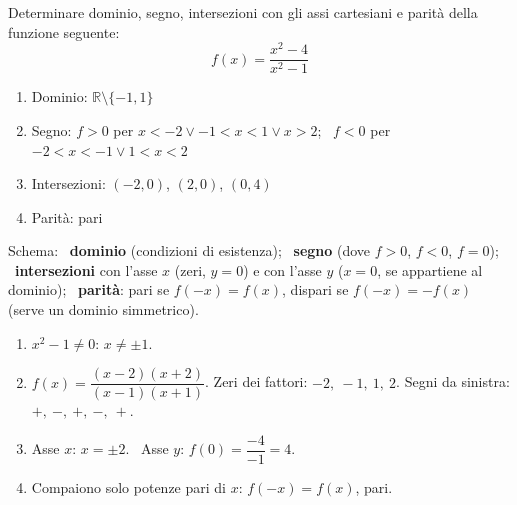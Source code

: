 \begin{question}[ID=1.4, subtitle={Studio di una funzione razionale pari}, difficulty=media, tags={funzioni, studio di funzione}]
Determinare dominio, segno, intersezioni con gli assi cartesiani e parità della funzione seguente:
\begin{equation*}
    f(x)=\dfrac{x^2-4}{x^2-1}
\end{equation*}
\begin{solution}
\begin{enumerate}
    \item Dominio: $\mathbb{R}\setminus\{-1,1\}$
    \item Segno: $f>0$ per $x<-2\vee-1<x<1\vee x>2$; \ $f<0$ per $-2<x<-1\vee1<x<2$
    \item Intersezioni: $(-2,0)$, $(2,0)$, $(0,4)$
    \item Parità: pari
\end{enumerate}
\end{solution}
\begin{explanation}
Schema: \ \textbf{dominio} (condizioni di esistenza); \ \textbf{segno} (dove $f>0$, $f<0$, $f=0$); \ \textbf{intersezioni} con l'asse $x$ (zeri, $y=0$) e con l'asse $y$ ($x=0$, se appartiene al dominio); \ \textbf{parità}: pari se $f(-x)=f(x)$, dispari se $f(-x)=-f(x)$ (serve un dominio simmetrico).
\begin{enumerate}
    \item $x^2-1\neq0$: $x\neq\pm1$.
    \item $f(x)=\dfrac{(x-2)(x+2)}{(x-1)(x+1)}$. Zeri dei fattori: $-2,\ -1,\ 1,\ 2$. Segni da sinistra: $+,\ -,\ +,\ -,\ +$.
    \item Asse $x$: $x=\pm2$. \ Asse $y$: $f(0)=\dfrac{-4}{-1}=4$.
    \item Compaiono solo potenze pari di $x$: $f(-x)=f(x)$, pari.
\end{enumerate}
\end{explanation}
\end{question}


